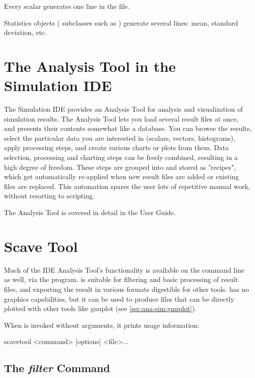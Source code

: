 Every scalar generates one  line in the file.

Statistics objects ( subclasses such as )
generate several lines: mean, standard deviation, etc.


\section{The Analysis Tool in the Simulation IDE}

The Simulation IDE provides an Analysis Tool for analysis and visualization
of simulation results. The Analysis Tool lets you load several result files
at once, and presents their contents somewhat like a database. You can
browse the results, select the particular data you are interested in
(scalars, vectors, histograms), apply processing steps, and create various
charts or plots from them. Data selection, processing and charting steps
can be freely combined, resulting in a high degree of freedom.
These steps are grouped into and stored as "recipes", which get automatically
re-applied when new result files are added or existing files are
replaced. This automation spares the user lots of repetitive manual work,
without resorting to scripting.

The Analysis Tool is covered in detail in the User Guide.


\section{Scave Tool}
\label{sec:ana-sim:scavetool}

Much of the IDE Analysis Tool's functionality is available on the command
line as well, via the  program.  is
suitable for filtering and basic processing of result files, and
exporting the result in various formats digestible for other tools.
 has no graphics capabilities, but it can be used
to produce files that can be directly plotted with other tools like
gnuplot (see \ref{sec:ana-sim:gnuplot}).

When  is invoked without arguments, it prints usage information:

\begin{commandline}
scavetool <command> [options] <file>...
\end{commandline}

\subsection{The \textit{filter} Command}

